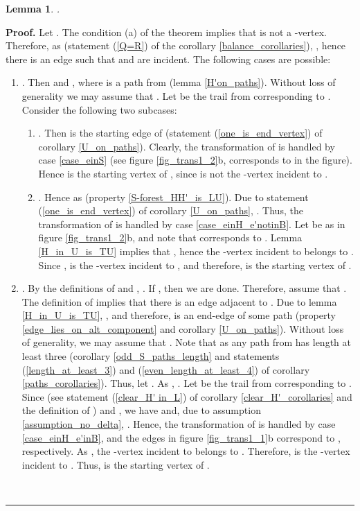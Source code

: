 \documentclass[a4paper, 12pt]{article}
\newtheorem{lemma}{Lemma}[subsection]
\newenvironment{proof}[1][Proof]{\noindent\textbf{#1.} }{\ \rule{0.5em}{0.5em}}
\begin{document}
\begin{lemma} \label{Q_LcupQ_B_in_endvertices_of_A'}
.
\end{lemma}
\begin{proof}
Let . The condition (a) of
the theorem implies that  is not a -vertex. Therefore, as  (statement (\ref{Q=R}) of the corollary
\ref{balance_corollaries}), , hence there
is an edge  such that  and  are
incident. The following cases are possible:

\renewcommand{\labelenumi}{(\arabic{enumi})}
\begin{enumerate}
\item \textbf{}. Then  and , where  is a path
from  (lemma \ref{H'on_paths}). Without loss of generality
we may assume that . Let  be the trail from
 corresponding to . Consider the following two subcases:
\begin{enumerate}
\item \textbf{}. Then  is the starting edge of 
(statement (\ref{one_is_end_vertex}) of corollary \ref{U_on_paths}).
Clearly, the transformation of  is handled by case
\ref{case_einS} (see figure \ref{fig_trans1_2}b,  corresponds
to  in the figure). Hence  is the starting vertex of ,
since  is not the -vertex incident to .

\item \textbf{}. Hence  as  (property \ref{S-forest_HH'_is_LU}).
Due to statement (\ref{one_is_end_vertex}) of corollary
\ref{U_on_paths}, . Thus, the
transformation of  is handled by case
\ref{case_einH_e'notinB}. Let  be as in figure
\ref{fig_trans1_2}b, and note that  corresponds to . Lemma
\ref{H_in_U_is_TU} implies that , hence the -vertex
incident to  belongs to . Since ,  is
the -vertex incident to , and therefore, is the starting
vertex of .
\end{enumerate}


\item \textbf{}. By the definitions of  and , . If , then we are
done. Therefore, assume that . The definition of
 implies that there is an edge  adjacent to
. Due to lemma \ref{H_in_U_is_TU}, , and therefore,  is an end-edge of some path  (property \ref{edge_lies_on_alt_component} and corollary
\ref{U_on_paths}). Without loss of generality, we may assume that
. Note that  as any path from  has length at least three
(corollary \ref{odd_S_paths_length} and statements
(\ref{length_at_least_3}) and (\ref{even_length_at_least_4}) of
corollary \ref{paths_corollaries}). Thus, let . As , . Let  be the
trail from  corresponding to . Since  (see
statement (\ref{clear_H' in_L}) of corollary
\ref{clear_H'_corollaries} and the definition of ) and , we have  and, due to assumption
\ref{assumption_no_delta}, . Hence, the
transformation of  is handled by case
\ref{case_einH_e'inB}, and the edges  in figure
\ref{fig_trans1_1}b correspond to , respectively. As
, the -vertex incident to  belongs to
. Therefore,  is the -vertex incident to . Thus,
 is the starting vertex of .
\end{enumerate}
\end{proof}
\end{document}
